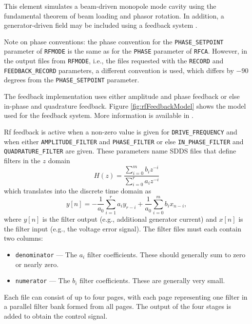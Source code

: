 This element simulates a beam-driven monopole mode cavity using the fundamental theorem of beam loading and phasor rotation.
In addition, a generator-driven field may be included using a feedback system \cite{Berenc-IPAC15-MOPMA006}.

Note on phase conventions: the phase convention for the \verb|PHASE_SETPOINT|  parameter of \verb|RFMODE| is the
same as for the \verb|PHASE| parameter of \verb|RFCA|. However, in the output files from \verb|RFMODE|, i.e., the
files requested with the \verb|RECORD| and \verb|FEEDBACK_RECORD| parameters, a different convention is used, which 
differs by $-90$ degrees from the \verb|PHASE_SETPOINT|  parameter. 

The feedback implementation uses either amplitude and phase feedback or else in-phase and quadrature feedback.
Figure \ref{fig:rfFeedbackModel} shows the model used for the feedback system.
More information is available in \cite{Berenc-IPAC15-MOPMA006}.

Rf feedback is active when a non-zero value is given for \verb|DRIVE_FREQUENCY| and when either
\verb|AMPLITUDE_FILTER| and \verb|PHASE_FILTER| or else
\verb|IN_PHASE_FILTER| and \verb|QUADRATURE_FILTER| are given.
These parameters name SDDS files that define filters in the $z$ domain 
\begin{equation}
H(z) = \frac{\sum\limits_{i=0}^m b_i z^{-i}}{\sum\limits_{i=0}^r a_i z^{-i}}
\end{equation}
which translates into the discrete time domain as
\begin{equation}
y[n ] = -\frac{1}{a_0}\sum\limits_{i=1}^r a_i y_{r-i} + \frac{1}{a_0}\sum\limits_{i=0}^m b_i x_{n-i},
\end{equation}
where $y[n]$ is the filter output (e.g., additional generator current) and $x[n]$ is the filter input (e.g., 
the voltage error signal). 
The filter files must each contain two columns:
\begin{itemize}
\item \verb|denominator| --- The $a_i$ filter coefficients. These should generally sum to zero or nearly zero.
\item \verb|numerator| --- The $b_i$ filter coefficients. These are generally very small.
\end{itemize}
Each file can consist of up to four pages, with each page representing one filter in a parallel filter bank
formed from all pages. The output of the four stages is added to obtain the control signal.

